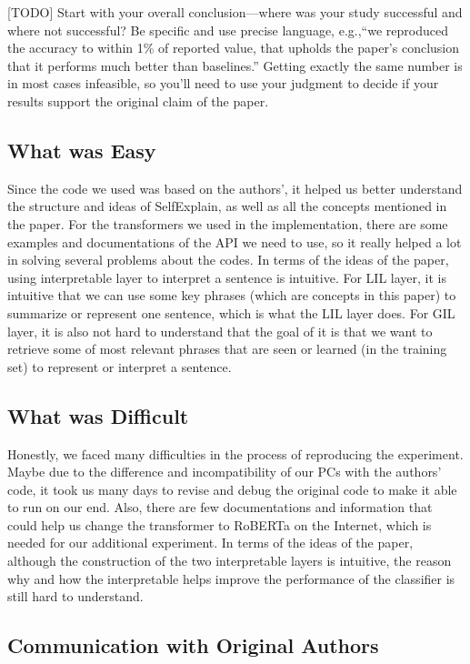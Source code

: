 \documentclass{article}
\begin{document}
[TODO] Start with your overall conclusion---where was your study successful and where not successful? Be specific and use precise language, e.g.,``we reproduced the accuracy to within 1\% of reported value, that upholds the paper's conclusion that it performs much better than baselines.'' Getting exactly the same number is in most cases infeasible, so you'll need to use your judgment to decide if your results support the original claim of the paper. 

\subsection*{What was Easy}

Since the code we used was based on the authors', it helped us better understand the structure and ideas of SelfExplain, as well as all the concepts mentioned in the paper. For the transformers we used in the implementation, there are some examples and documentations of the API we need to use, so it really helped a lot in solving several problems about the codes. In terms of the ideas of the paper, using interpretable layer to interpret a sentence is intuitive. For LIL layer, it is intuitive that we can use some key phrases (which are concepts in this paper) to summarize or represent one sentence, which is what the LIL layer does. For GIL layer, it is also not hard to understand that the goal of it is that we want to retrieve some of most relevant phrases that are seen or learned (in the training set) to represent or interpret a sentence.  

\subsection*{What was Difficult}

Honestly, we faced many difficulties in the process of reproducing the experiment. Maybe due to the difference and incompatibility of our PCs with the authors' code, it took us many days to revise and debug the original code to make it able to run on our end. Also, there are few documentations and information that could help us change the transformer to RoBERTa on the Internet, which is needed for our additional experiment. In terms of the ideas of the paper, although the construction of the two interpretable layers is intuitive, the reason why and how the interpretable helps improve the performance of the classifier is still hard to understand.

\subsection*{Communication with Original Authors}
\end{document}
